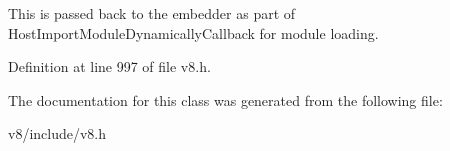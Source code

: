 This is passed back to the embedder as part of Host\+Import\+Module\+Dynamically\+Callback for module loading. 

Definition at line 997 of file v8.\+h.



The documentation for this class was generated from the following file\+:\begin{DoxyCompactItemize}
\item 
v8/include/v8.\+h\end{DoxyCompactItemize}
